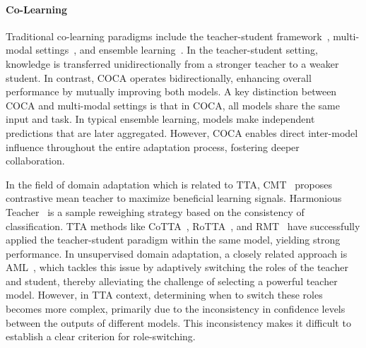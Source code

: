 

\vspace{-15pt}
\paragraph{Co-Learning} Traditional co-learning paradigms include the teacher-student framework~\cite{hu2022teacher, beyer2022knowledge}, multi-modal settings~\cite{yin2023crossmatch}, and ensemble learning~\cite{yang2023survey}. In the teacher-student setting, knowledge is transferred unidirectionally from a stronger teacher to a weaker student. In contrast, COCA operates bidirectionally, enhancing overall performance by mutually improving both models. A key distinction between COCA and multi-modal settings is that in COCA, all models share the same input and task. In typical ensemble learning, models make independent predictions that are later aggregated. However, COCA enables direct inter-model influence throughout the entire adaptation process, fostering deeper collaboration. 

In the field of domain adaptation which is related to TTA, CMT~\cite{cao2023contrastive} proposes contrastive mean teacher to maximize beneficial learning signals. Harmonious Teacher~\cite{deng2023harmonious} is a sample reweighing strategy based on the consistency of classification. TTA methods like CoTTA~\cite{wang2022continual}, RoTTA~\cite{yuan2023robust}, and RMT~\cite{dobler2023robust} have successfully applied the teacher-student paradigm within the same model, yielding strong performance. In unsupervised domain adaptation, a closely related approach is AML~\cite{zhou2023adaptive}, which tackles this issue by adaptively switching the roles of the teacher and student, thereby alleviating the challenge of selecting a powerful teacher model. However, in TTA context, determining when to switch these roles becomes more complex, primarily due to the inconsistency in confidence levels between the outputs of different models. This inconsistency makes it difficult to establish a clear criterion for role-switching.



